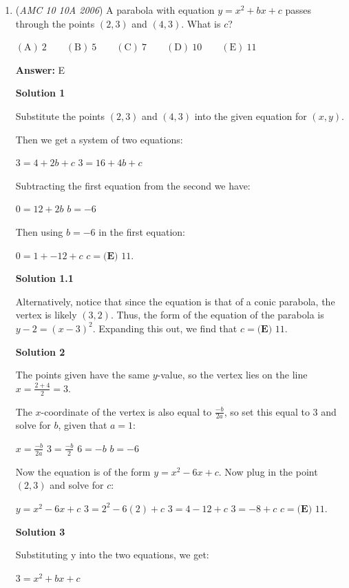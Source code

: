\begin{enumerate}
	\item (\textit{AMC 10 10A 2006}) A parabola with equation $y=x^2+bx+c$ passes through the points $(2,3)$ and $(4,3)$.  What is $c$?


 $\mathrm{(A)}\ 2\qquad\mathrm{(B)}\ 5\qquad\mathrm{(C)}\ 7\qquad\mathrm{(D)}\ 10\qquad\mathrm{(E)}\ 11$

 \textbf{Answer: }E



\textbf{Solution 1}

Substitute the points $(2,3)$ and $(4,3)$ into the given equation for $(x,y)$.

 Then we get a system of two equations:

 $3=4+2b+c$
$3=16+4b+c$

 Subtracting the first equation from the second we have:

 $0=12+2b$
$b=-6$

 Then using $b=-6$ in the first equation:

 $0=1+-12+c$
$c=\boxed{\textbf{(E) }11}$.

 



\textbf{Solution 1.1}

Alternatively, notice that since the equation is that of a conic parabola, the vertex is likely $(3,2)$. Thus, the form of the equation of the parabola is $y - 2 = (x - 3)^2$. Expanding this out, we find that $c=\boxed{\textbf{(E) }11}$.

 



\textbf{Solution 2}

The points given have the same $y$-value, so the vertex lies on the line $x=\frac{2+4}{2}=3$.

 The $x$-coordinate of the vertex is also equal to $\frac{-b}{2a}$, so set this equal to $3$ and solve for $b$, given that $a=1$:

 $x=\frac{-b}{2a}$
$3=\frac{-b}{2}$
$6=-b$
$b=-6$

 Now the equation is of the form $y=x^2-6x+c$.  Now plug in the point $(2,3)$ and solve for $c$:

 $y=x^2-6x+c$
$3=2^2-6(2)+c$
$3=4-12+c$
$3=-8+c$
$c=\boxed{\textbf{(E) }11}$.

 



\textbf{Solution 3}

Substituting y into the two equations, we get:

 $3=x^2+bx+c$


\end{enumerate}
